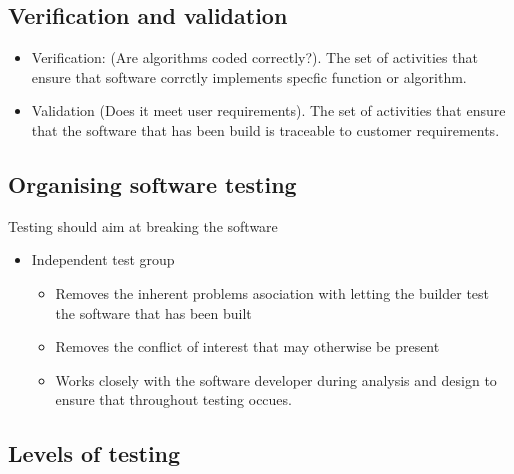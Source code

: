 \documentclass{article}
\begin{document}
\subsection{Verification and validation}

\begin{itemize}
  \item Verification: (Are algorithms coded correctly?). The set of activities that ensure that software corrctly implements specfic function or algorithm.
  \item Validation (Does it meet user requirements). The set of activities that ensure that the software that has been build is traceable to customer requirements.
\end{itemize}

\subsection{Organising software testing}
Testing should aim at breaking the software
\begin{itemize}
  \item Independent test group
  \begin{itemize}
    \item Removes the inherent problems asociation with letting the builder test the software that has been built
    \item Removes the conflict of interest that may otherwise be present
    \item Works closely with the software developer during analysis and design to ensure that throughout testing occues.
  \end{itemize}
\end{itemize}

\subsection{Levels of testing}
\end{document}
